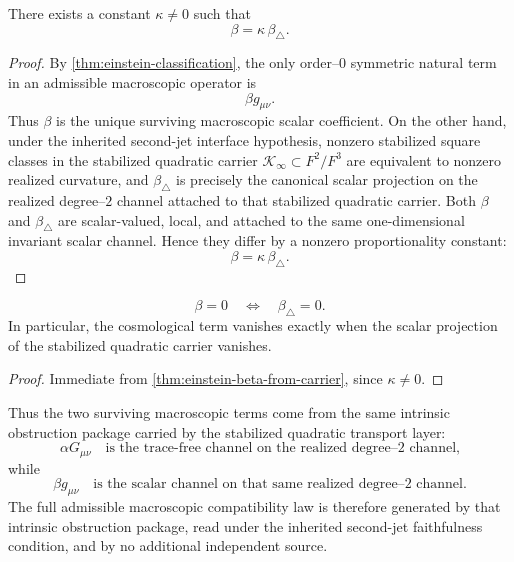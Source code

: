 \begin{theorem}
	\label{thm:einstein-beta-from-carrier}
	There exists a constant \(\kappa\neq 0\) such that
	\[
		\beta=\kappa\,\beta_\triangle.
	\]
\end{theorem}
\begin{proof}
	By \cref{thm:einstein-classification}, the only order--\(0\) symmetric
	natural term in an admissible macroscopic operator is
	\[
		\beta g_{\mu\nu}.
	\]
	Thus \(\beta\) is the unique surviving macroscopic scalar coefficient.
	On the other hand, under the inherited second-jet interface
	hypothesis, nonzero stabilized square classes in the stabilized
	quadratic carrier \(\mathcal K_\infty\subset F^2/F^3\) are
	equivalent to nonzero realized curvature, and
	\(\beta_\triangle\) is precisely the canonical scalar projection on
	the realized degree--\(2\) channel attached to that stabilized
	quadratic carrier.
	Both \(\beta\) and \(\beta_\triangle\) are scalar-valued, local, and
	attached to the same one-dimensional invariant scalar channel.
	Hence they differ by a nonzero proportionality constant:
	\[
		\beta=\kappa\,\beta_\triangle.
	\]
\end{proof}
\begin{corollary}
	\[
		\beta=0
		\quad\Longleftrightarrow\quad
		\beta_\triangle=0.
	\]
	In particular, the cosmological term vanishes exactly when the scalar
	projection of the stabilized quadratic carrier vanishes.
\end{corollary}
\begin{proof}
	Immediate from \cref{thm:einstein-beta-from-carrier}, since
	\(\kappa\neq 0\).
\end{proof}
\begin{remark}
	Thus the two surviving macroscopic terms come from the same intrinsic
	obstruction package carried by the stabilized quadratic transport
	layer:
	\[
		\alpha G_{\mu\nu}
		\quad\text{is the trace-free channel on the realized degree--\(2\) channel,}
	\]
	while
	\[
		\beta g_{\mu\nu}
		\quad\text{is the scalar channel on that same realized degree--\(2\) channel.}
	\]
	The full admissible macroscopic compatibility law is therefore
	generated by that intrinsic obstruction package, read under the
	inherited second-jet faithfulness condition, and by no additional
	independent source.
\end{remark}
